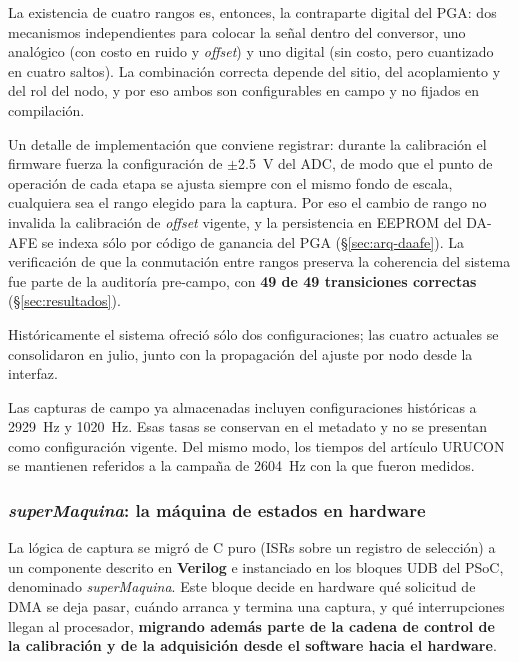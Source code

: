 La existencia de cuatro rangos es, entonces, la contraparte digital del PGA: dos
mecanismos independientes para colocar la se\~nal dentro del conversor, uno anal\'ogico
(con costo en ruido y \emph{offset}) y uno digital (sin costo, pero cuantizado en cuatro
saltos). La combinaci\'on correcta depende del sitio, del acoplamiento y del rol del nodo,
y por eso ambos son configurables en campo y no fijados en compilaci\'on.

Un detalle de implementaci\'on que conviene registrar: durante la calibraci\'on el
firmware fuerza la configuraci\'on de $\pm$\SI{2.5}{\volt} del ADC, de modo que el punto de
operaci\'on de cada etapa se ajusta siempre con el mismo fondo de escala, cualquiera sea el
rango elegido para la captura. Por eso el cambio de rango no invalida la calibraci\'on de
\emph{offset} vigente, y la persistencia en EEPROM del DA-AFE se indexa s\'olo por c\'odigo
de ganancia del PGA (\S\ref{sec:arq-daafe}). La verificaci\'on de que la conmutaci\'on entre rangos preserva
la coherencia del sistema fue parte de la auditor\'ia pre-campo, con
\textbf{49 de 49 transiciones correctas} (\S\ref{sec:resultados}).

Hist\'oricamente el sistema ofreci\'o s\'olo dos configuraciones; las cuatro actuales se
consolidaron en julio, junto con la propagaci\'on del ajuste por nodo desde la interfaz.

Las capturas de campo ya almacenadas incluyen configuraciones hist\'oricas a
\SI{2929}{\hertz} y \SI{1020}{\hertz}. Esas tasas se conservan en el metadato y no se
presentan como configuraci\'on vigente. Del mismo modo, los tiempos del art\'iculo URUCON
se mantienen referidos a la campa\~na de \SI{2604}{\hertz} con la que fueron medidos.

\subsubsection{\emph{superMaquina}: la m\'aquina de estados en hardware}

La l\'ogica de captura se migr\'o de C puro (ISRs sobre un registro de selecci\'on) a un
componente descrito en \textbf{Verilog} e instanciado en los bloques UDB del PSoC,
denominado \emph{superMaquina}. Este bloque decide en hardware qu\'e solicitud de DMA se
deja pasar, cu\'ando arranca y termina una captura, y qu\'e interrupciones llegan al
procesador, \textbf{migrando adem\'as parte de la cadena de control de la calibraci\'on y
de la adquisici\'on desde el software hacia el hardware}.

